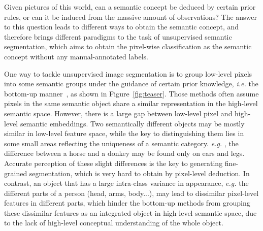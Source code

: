 \documentclass[runningheads]{llncs}
\def\eg{\emph{e.g. }}
\def\ie{\emph{i.e. }}
\begin{document}
Given pictures of this world, can a semantic concept be deduced by certain prior rules, or can it be induced from the massive amount of observations? The answer to this question leads to different ways to obtain the semantic concept, and therefore brings different paradigms to the task of unsupervised semantic segmentation, which aims to obtain the pixel-wise classification as the semantic concept without any manual-annotated labels. 


One way to tackle unsupervised image segmentation is to group low-level pixels into some semantic groups under the guidance of certain prior knowledge, \ie the bottom-up manner~\cite{PiCIE,IIC,InfoSeg,kanezaki2018unsupervised,kim2020unsupervised,InMARS,MaskContrast}, as shown in Figure~\ref{fig:teaser}. Those methods often assume pixels in the same semantic object share a similar representation in the high-level semantic space. However, there is a large gap between low-level pixel and high-level semantic embeddings. Two semantically different objects may be mostly similar in low-level feature space, while the key to distinguishing them lies in some small areas reflecting the uniqueness of a semantic category. \eg, the difference between a horse and a donkey may be found only on ears and legs. Accurate perception of these slight differences is the key to generating fine-grained segmentation, which is very hard to obtain by pixel-level deduction. In contrast, an object that has a large intra-class variance in appearance, \eg the different parts of a person (head, arms, body...), may lead to dissimilar pixel-level features in different parts, which hinder the bottom-up methods from grouping these dissimilar features as an integrated object in high-level semantic space, due to the lack of high-level conceptual understanding of the whole object.
\end{document}

